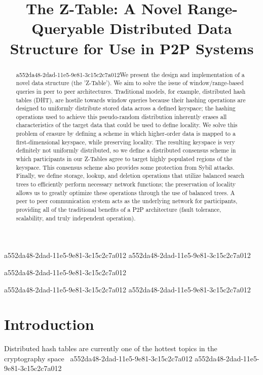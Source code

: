 \documentclass[12pt]{article}
\title{The Z-Table: A Novel Range-Queryable Distributed Data Structure for Use in P2P Systems}
\begin{document}
a552da48-2dad-11e5-9e81-3c15c2c7a012
a552da48-2dad-11e5-9e81-3c15c2c7a012\maketitle
a552da48-2dad-11e5-9e81-3c15c2c7a012
\begin{abstract}
a552da48-2dad-11e5-9e81-3c15c2c7a012We present the design and implementation of a novel data structure (the 'Z-Table'). We aim to solve the issue of window/range-based queries in peer to peer architectures. Traditional models, for example,  distributed hash tables (DHT), are hostile towards window queries because their hashing operations are designed to uniformly distribute stored data across a defined keyspace; the hashing operations used to achieve this pseudo-random distribution inherently erases all characteristics of the target data that could be used to define locality. We solve this problem of erasure by defining a scheme in which higher-order data is mapped to a first-dimensional keyspace, while preserving locality. The resulting keyspace is very definitely not uniformly distributed, so we define a distributed consensus scheme in which participants in our Z-Tables agree to target highly populated regions of the keyspace. This consensus scheme also provides some protection from Sybil attacks. Finally, we define storage, lookup, and deletion operations that utilize balanced search trees to efficiently perform necessary network functions; the preservation of locality allows us to greatly optimize these operations through the use of balanced trees. A peer to peer communication system acts as the underlying network for participants, providing all of the traditional benefits of a P2P architecture (fault tolerance, scalability, and truly independent operation).
\end{abstract}
a552da48-2dad-11e5-9e81-3c15c2c7a012
a552da48-2dad-11e5-9e81-3c15c2c7a012
\newpage
\section{Introduction}
Distributed hash tables are currently one of the hottest topics in the cryptography space~\cite{Stoica:2001dj,Rowstron:2001ea,Ratnasamy:2001wn}
a552da48-2dad-11e5-9e81-3c15c2c7a012
\printbibliography
a552da48-2dad-11e5-9e81-3c15c2c7a012
\end{document}
